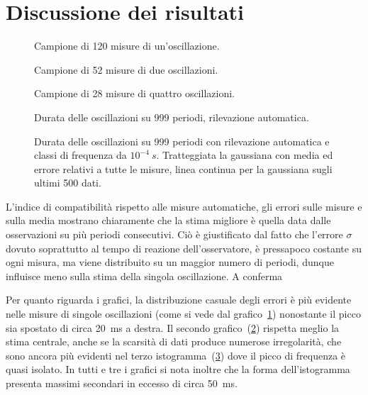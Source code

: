 \documentclass[italian,a4paper,10pt]{article}
\theoremstyle{definition}
\begin{document}
\section{Discussione dei risultati}
   \begin {figure}[p]
      \begin{center}
        
      \end{center}\caption{Campione di 120 misure di un'oscillazione.}\label{gr1}
    \end {figure}
      \begin {figure}[p]
      \begin{center}
        
      \end{center}\caption{Campione di 52 misure di due oscillazioni.}\label{gr2}
    \end {figure}
         \begin {figure}[p]
      \begin{center}
        
      \end{center}\caption{Campione di 28 misure di quattro oscillazioni.}\label{gr4}
    \end {figure}
       \begin {figure}[p]
      \begin{center}
        
      \end{center}\caption{Durata delle oscillazioni su 999 periodi, rilevazione automatica.}\label{gr1000}
    \end {figure}
           \begin {figure}[p]
      \begin{center}
        
      \end{center}\caption{Durata delle oscillazioni su 999 periodi con rilevazione automatica e classi di frequenza da $10^{-4}~s$. Tratteggiata la gaussiana con media ed errore relativi a tutte le misure, linea continua per la gaussiana sugli ultimi 500 dati.}\label{sist}
    \end {figure}
L'indice di compatibilità rispetto alle misure automatiche, gli errori sulle misure e sulla media mostrano chiaramente che la stima migliore è quella data dalle osservazioni su più periodi consecutivi. Ciò è giustificato dal fatto che l'errore $\sigma$ dovuto soprattutto al tempo di reazione dell'osservatore, è pressapoco costante su ogni misura, ma viene distribuito su un maggior numero di periodi, dunque influisce meno sulla stima della singola oscillazione. A conferma 

Per quanto riguarda i grafici, la distribuzione casuale degli errori è più evidente nelle misure di singole oscillazioni (come si vede dal grafico~\ref{gr1}) nonostante il picco sia spostato di circa 20~ms a destra. Il secondo grafico~(\ref{gr2}) rispetta meglio la stima centrale, anche se la scarsità di dati produce numerose irregolarità, che sono ancora più evidenti nel terzo istogramma~(\ref{gr4}) dove il picco di frequenza è quasi isolato. In tutti e tre i grafici si nota inoltre che la forma dell'istogramma presenta massimi secondari in eccesso di circa 50~ms.
\end{document}
